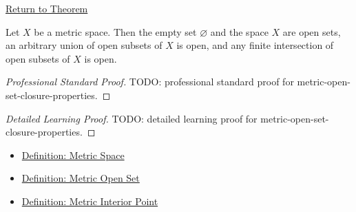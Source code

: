 \newpage
{}
\label{prf:metric-open-set-closure-properties}

\begin{remark*}[Return]
\hyperref[thm:metric-open-set-closure-properties]{Return to Theorem}
\end{remark*}

\begin{theorem*}
Let \(X\) be a metric space.  Then the empty set \(\varnothing\) and the space
\(X\) are open sets, an arbitrary union of open subsets of \(X\) is open, and
any finite intersection of open subsets of \(X\) is open.
\end{theorem*}

\begin{proof}[Professional Standard Proof]
\LRAProofBodyStart
TODO: professional standard proof for metric-open-set-closure-properties.
\end{proof}

\begin{proof}[Detailed Learning Proof]
\LRAProofBodyStart
TODO: detailed learning proof for metric-open-set-closure-properties.
\end{proof}

\begin{remark*}
\end{remark*}

\begin{dependencies}
\begin{itemize}
  \item \hyperref[def:metric-space]{Definition: Metric Space}
  \item \hyperref[def:metric-open-set]{Definition: Metric Open Set}
  \item \hyperref[def:metric-interior-point]{Definition: Metric Interior Point}
\end{itemize}
\end{dependencies}

\clearpage
